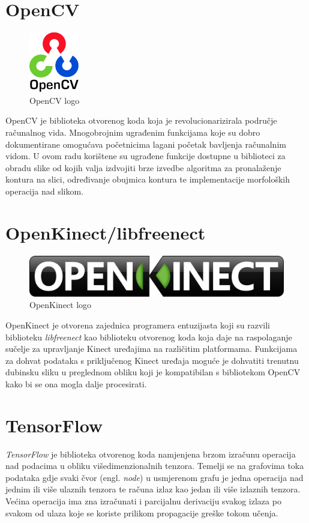 \documentclass[times, utf8, diplomski, numeric]{fer}
\begin{document}
\section{OpenCV}
\begin{figure}[h!]
\centering
\includegraphics[scale=0.6]{logo_opencv}
\caption{OpenCV logo}
\end{figure}
OpenCV je biblioteka otvorenog koda koja je revolucionarizirala područje računalnog vida. Mnogobrojnim ugrađenim funkcijama koje su dobro dokumentirane omogućava početnicima lagani početak bavljenja računalnim vidom. U ovom radu korištene su ugrađene funkcije dostupne u biblioteci za obradu slike od kojih valja izdvojiti brze izvedbe algoritma za pronalaženje kontura na slici, određivanje obujmica kontura te implementacije morfoloških operacija nad slikom.

\section{OpenKinect/libfreenect}
\begin{figure}[H]
\centering
\includegraphics[scale=0.3]{logo_openkinect}
\caption{OpenKinect logo}
\end{figure}
OpenKinect je otvorena zajednica programera entuzijasta koji su razvili biblioteku \textit{libfreenect} kao biblioteku otvorenog koda koja daje na raspolaganje sučelje za upravljanje Kinect uređajima na različitim platformama. Funkcijama za dohvat podataka s priključenog Kinect uređaja moguće je dohvatiti trenutnu dubinsku sliku u preglednom obliku koji je kompatibilan s bibliotekom OpenCV kako bi se ona mogla dalje procesirati.

\section{TensorFlow}
\textit{TensorFlow} je biblioteka otvorenog koda namjenjena brzom izračunu operacija nad podacima u obliku višedimenzionalnih tenzora. Temelji se na grafovima toka podataka gdje svaki čvor (engl. \textit{node}) u usmjerenom grafu je jedna operacija nad jednim ili više ulaznih tenzora te računa izlaz kao jedan ili više izlaznih tenzora. Većina operacija ima zna izračunati i parcijalnu derivaciju svakog izlaza po svakom od ulaza koje se koriste prilikom propagacije greške tokom učenja. 
\end{document}
